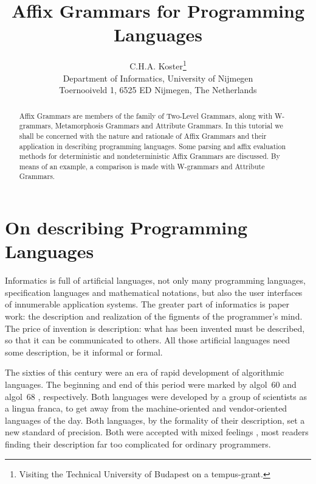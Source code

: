 \pagestyle{myheadings}
\setlength{\topmargin}{0cm}
\setlength{\topsep}{2mm}
\setlength{\oddsidemargin}{0cm}
\setlength{\evensidemargin}{0cm}
\setlength{\textheight}{23.5cm}
\setlength{\textwidth}{16cm}
\pagestyle{empty}

\title{\protect\vspace{-1.5cm}Affix Grammars for Programming Languages}
\author{C.H.A. Koster\thanks{Visiting the Technical University of Budapest
on a {\sc tempus}-grant.}\\
Department of Informatics, University of Nijmegen\\
Toernooiveld 1, 6525 ED Nijmegen, The Netherlands}
\date{}

\maketitle
\begin{abstract}
Affix Grammars are members of the family of Two-Level Grammars,
along with W-grammars, Metamorphosis Grammars and Attribute Grammars.
In this tutorial we shall be concerned with
the nature and rationale of Affix Grammars and their application in
describing programming languages. 
Some parsing and affix evaluation methods for deterministic
and nondeterministic Affix Grammars are discussed.
By means of an example, a comparison is made with W-grammars and
Attribute Grammars.
\end{abstract}
\section{On describing Programming Languages}
Informatics is full of artificial languages, not only many
programming languages, specification languages and mathematical
notations, but also the user interfaces of innumerable application
systems. The greater part of informatics is paper work: the
description and realization of the figments of the programmer's
mind. The price of invention is description: what has been invented
must be described, so that it can be communicated to others. All
those artificial languages need some description, be it informal or
formal.

The sixties of this century were an era of rapid development
of algorithmic languages. The beginning and end of this period were
marked by {\sc algol~60} \cite{naur:algol60} and {\sc algol~68}
\cite{wijngaarden:algol68}, respectively. Both languages were
developed by a group of scientists as a lingua franca, to get away
from the machine-oriented and vendor-oriented languages of the day. Both
languages, by the formality of their description, set a new standard of
precision. Both were accepted with mixed feelings \cite{bemer:alghist},
most readers finding their description far too complicated for ordinary
programmers.

